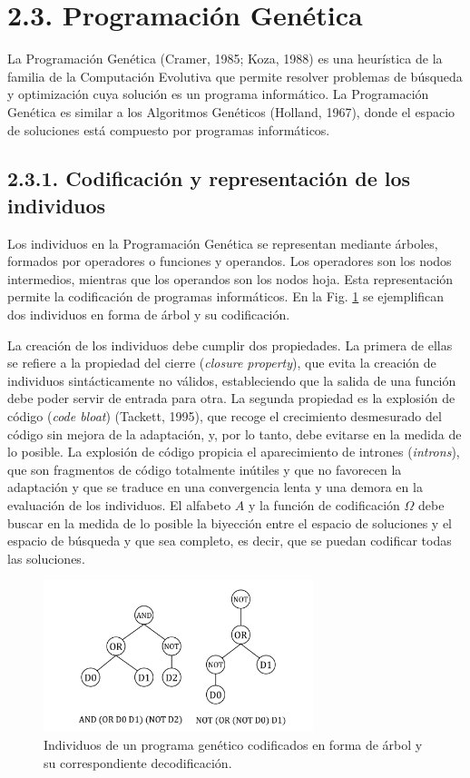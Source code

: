 \documentclass[spanish,a4paper,12pt,twoside]{report}
\begin{document}
  \section*{\Large 2.3. Programación Genética}
  La Programación Genética (Cramer, 1985; Koza, 1988) es una heurística de la familia de la Computación Evolutiva que permite resolver problemas de búsqueda y optimización cuya solución es un programa informático. La Programación Genética es similar a los Algoritmos Genéticos (Holland, 1967), donde el espacio de soluciones está compuesto por programas informáticos.
    \subsection*{\large 2.3.1. Codificación y representación de los individuos}
    Los individuos en la Programación Genética se representan mediante árboles, formados por operadores o funciones y operandos. Los operadores son los nodos intermedios, mientras que los operandos son los nodos hoja. Esta representación permite la codificación de programas informáticos. En la Fig. \ref{fig:2} se ejemplifican dos individuos en forma de árbol y su codificación. \par
    La creación de los individuos debe cumplir dos propiedades. La primera de ellas se refiere a la propiedad del cierre (\emph{closure property}), que evita la creación de individuos sintácticamente no válidos, estableciendo que la salida de una función debe poder servir de entrada para otra. La segunda propiedad es la explosión de código (\emph{code bloat}) (Tackett, 1995), que recoge el crecimiento desmesurado del código sin mejora de la adaptación, y, por lo tanto, debe evitarse en la medida de lo posible. La explosión de código propicia el aparecimiento de intrones (\emph{introns}), que son fragmentos de código totalmente inútiles y que no favorecen la adaptación y que se traduce en una convergencia lenta y una demora en la evaluación de los individuos. El alfabeto $A$ y la función de codificación $\Omega$ debe buscar en la medida de lo posible la biyección entre el espacio de soluciones y el espacio de búsqueda y que sea completo, es decir, que se puedan codificar todas las soluciones. \par
    \begin{figure}[H]
      \centering
      \includegraphics[width = 0.7\textwidth]{resources/Fig2.pdf}
      \caption{Individuos de un programa genético codificados en forma de árbol y su correspondiente decodificación.}
      \label{fig:2}
    \end{figure} \par
  
\end{document}
